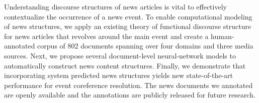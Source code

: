Understanding discourse structures of news articles is vital to effectively contextualize the occurrence of a news event. To enable computational modeling of news structures, we apply an existing theory of functional discourse structure for news articles that revolves around the main event and create a human-annotated corpus of 802 documents spanning over four domains and three media sources. Next, we propose several document-level neural-network models to automatically construct news content structures. Finally, we demonstrate that incorporating system predicted news structures yields new state-of-the-art performance for event coreference resolution. The news documents we annotated are openly available and the annotations are publicly released for future research.

